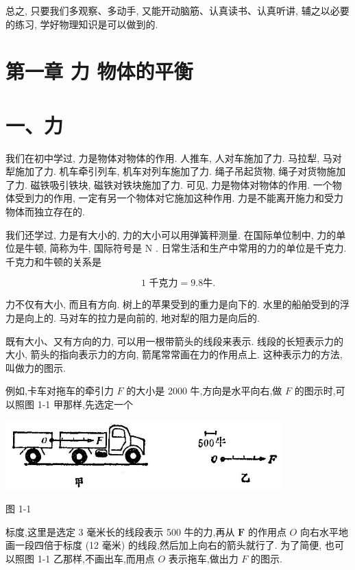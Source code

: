 \documentclass[10pt]{article}
\begin{document}
总之, 只要我们多观察、多动手, 又能开动脑筋、认真读书、认真听讲, 辅之以必要的练习, 学好物理知识是可以做到的.

\section*{第一章 力 物体的平衡}

\section*{一、力}

我们在初中学过, 力是物体对物体的作用. 人推车, 人对车施加了力. 马拉犁, 马对犁施加了力. 机车牵引列车, 机车对列车施加了力. 绳子吊起货物, 绳子对货物施加了力. 磁铁吸引铁块, 磁铁对铁块施加了力. 可见, 力是物体对物体的作用. 一个物体受到力的作用, 一定有另一个物体对它施加这种作用. 力是不能离开施力和受力物体而独立存在的.

我们还学过, 力是有大小的, 力的大小可以用弹簧秤测量. 在国际单位制中, 力的单位是牛顿, 简称为牛, 国际符号是 \(\mathrm{N}\) . 日常生活和生产中常用的力的单位是千克力. 千克力和牛顿的关系是

\[
\text{1 千克力} = {9.8}\text{牛.}
\]

力不仅有大小, 而且有方向. 树上的苹果受到的重力是向下的. 水里的船舶受到的浮力是向上的. 马对车的拉力是向前的, 地对犁的阻力是向后的.

既有大小、又有方向的力, 可以用一根带箭头的线段来表示. 线段的长短表示力的大小, 箭头的指向表示力的方向, 箭尾常常画在力的作用点上. 这种表示力的方法, 叫做力的图示.

例如,卡车对拖车的牵引力 \(F\) 的大小是 2000 牛,方向是水平向右,做 \(F\) 的图示时,可以照图 1-1 甲那样,先选定一个

\begin{center}
\includegraphics[max width=0.8\textwidth]{images/01912d55-147c-70aa-b0e0-1782a122f948_17_361745.jpg}
\end{center}

图 1-1

标度,这里是选定 3 毫米长的线段表示 500 牛的力,再从 \(\mathbf{F}\) 的作用点 \(O\) 向右水平地画一段四倍于标度 (12 毫米) 的线段,然后加上向右的箭头就行了. 为了简便, 也可以照图 1-1 乙那样,不画出车,而用点 \(O\) 表示拖车,做出力 \(F\) 的图示.
\end{document}
